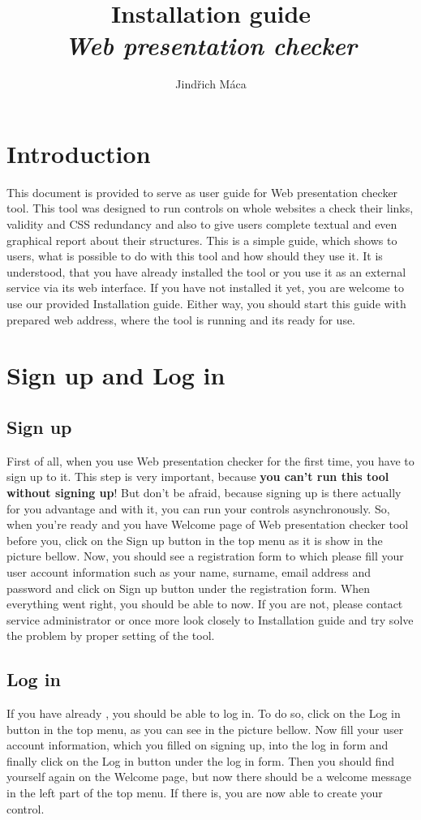 \documentclass[12pt,a4paper]{article}
\author{Jindřich Máca}
\title{Installation guide\\\textit{Web presentation checker}}
\begin{document}
\maketitle
\tableofcontents
\newpage

\section{Introduction}
This document is provided to serve as user guide for Web presentation checker tool. This tool was designed to run controls on whole websites a check their links, validity and CSS redundancy and also to give users complete textual and even graphical report about their structures. This is a simple guide, which shows to users, what is possible to do with this tool and how should they use it. It is understood, that you have already installed the tool or you use it as an external service via its web interface. If you have not installed it yet, you are welcome to use our provided Installation guide. Either way, you should start this guide with prepared web address, where the tool is running and its ready for use.
\section{Sign up and Log in}
\subsection{Sign up} \label{signup}
First of all, when you use Web presentation checker for the first time, you have to sign up to it. This step is very important, because \textbf{you can't run this tool without signing up}! But don't be afraid, because signing up is there actually for you advantage and with it, you can run your controls asynchronously. So, when you're ready and you have Welcome page of Web presentation checker tool before you, click on the Sign up button in the top menu as it is show in the picture bellow. Now, you should see a registration form to which please fill your user account information such as your name, surname, email address and password and click on Sign up button under the registration form. When everything went right, you should be able to  now. If you are not, please contact service administrator or once more look closely to Installation guide and try solve the problem by proper setting of the tool.
\subsection{Log in} \label{login}
If you have already , you should be able to log in. To do so, click on the Log in button in the top menu, as you can see in the picture bellow. Now fill your user account information, which you filled on signing up, into the log in form and finally click on the Log in button under the log in form. Then you should find yourself again on the Welcome page, but now there should be a welcome message in the left part of the top menu. If there is, you are now able to create your control.
\end{document}
